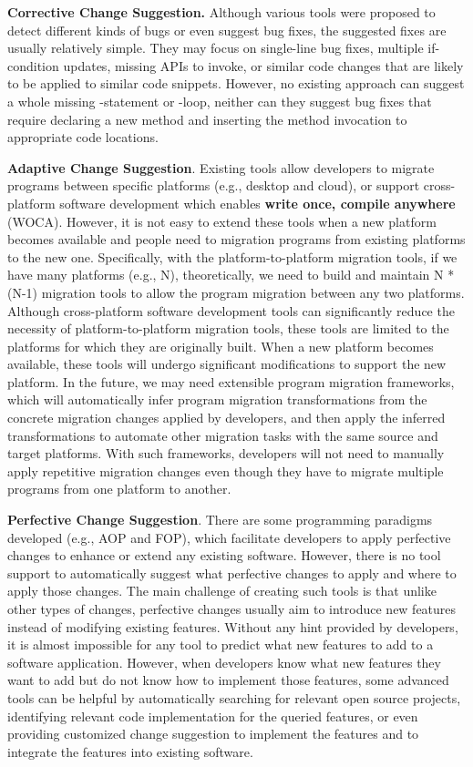 \textbf{Corrective Change Suggestion.} Although various tools were proposed to detect different kinds of bugs or even suggest bug fixes, the suggested fixes are usually relatively simple. They may focus on single-line bug fixes, multiple if-condition updates, missing APIs to invoke, or similar code changes that are likely to be applied to similar code snippets. However, no existing approach can suggest a whole missing -statement or -loop, neither can they suggest bug fixes that require declaring a new method and inserting the method invocation to appropriate code locations.

\textbf{Adaptive Change Suggestion}. Existing tools allow developers to migrate programs between specific platforms (e.g., desktop and cloud), or support cross-platform software development which enables \textbf{write once, compile anywhere} (WOCA). However, it is not easy to extend these tools when a new platform becomes available and people need to migration programs from existing platforms to the new one. Specifically, 
with the platform-to-platform migration tools, if we have many platforms (e.g., N), theoretically, we need to build and maintain N * (N-1) migration tools to allow the program migration between any two platforms. Although cross-platform software development tools can significantly reduce the necessity of platform-to-platform migration tools, these tools are limited to the platforms for which they are originally built. When a new platform becomes available, these tools will undergo significant modifications to support the new platform. In the future, we may need extensible program migration frameworks, which will automatically infer program migration transformations from the concrete migration changes applied by developers, and then apply the inferred transformations to automate other migration tasks with the same source and target platforms. With such frameworks, developers will not need to manually apply repetitive migration changes even though they have to migrate multiple programs from one platform to another.


\textbf{Perfective Change Suggestion}. There are some programming paradigms developed (e.g., AOP and FOP), which facilitate developers to apply perfective changes to enhance or extend any existing software. However, there is no tool support to automatically suggest what perfective changes to apply and where to apply those changes. The main challenge of creating such tools is that unlike other types of changes, perfective changes usually aim to introduce new features instead of modifying existing features. Without any hint provided by developers, it is almost impossible for any tool to predict what new features to add to a software application. However, when developers know what new features they want to add but do not know how to implement those features, some advanced tools can be helpful by automatically searching for relevant open source projects, identifying relevant code implementation for the queried features, or even providing customized change suggestion to implement the features and to integrate the features into existing software.

